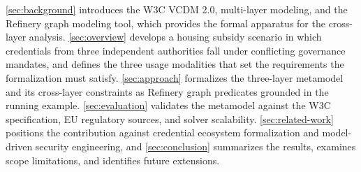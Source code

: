 \autoref{sec:background} introduces the W3C \ac{VCDM} 2.0, multi-layer modeling, and the Refinery graph modeling tool, which provides the formal apparatus for the cross-layer analysis. \autoref{sec:overview} develops a housing subsidy scenario in which credentials from three independent authorities fall under conflicting governance mandates, and defines the three usage modalities that set the requirements the formalization must satisfy. \autoref{sec:approach} formalizes the three-layer metamodel and its cross-layer constraints as Refinery graph predicates grounded in the running example. \autoref{sec:evaluation} validates the metamodel against the W3C specification, EU regulatory sources, and solver scalability. \autoref{sec:related-work} positions the contribution against credential ecosystem formalization and model-driven security engineering, and \autoref{sec:conclusion} summarizes the results, examines scope limitations, and identifies future extensions.
